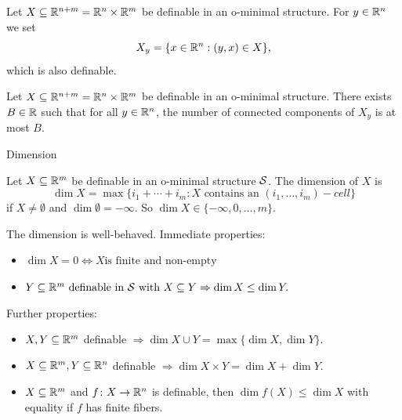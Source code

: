 \documentclass{beamer}
\begin{document}
\begin{frame}
  \begin{minipage}{0.6\linewidth}
    \begin{lemma}
      Let $X\subseteq {\mathbb{R}}^{n+m}= {\mathbb{R}}^{n}\times
      {\mathbb{R}}^m$ be definable in an o-minimal structure. For $y\in{\mathbb{R}}^n$ we set
      \begin{equation*}
        X_y = \{ x\in{\mathbb{R}}^n : (y,x)\in X\},
      \end{equation*}
      which is also definable. 
    \end{lemma}
  \end{minipage}  \begin{minipage}{0.3\linewidth}
  \end{minipage}

  \begin{theorem}
    Let $X\subseteq {\mathbb{R}}^{n+m}= {\mathbb{R}}^{n}\times
    {\mathbb{R}}^m$ be definable in an o-minimal structure.
    There exists $B\in{\mathbb{R}}$ such that for all
    $y\in{\mathbb{R}}^n$, the number of
    connected components of $X_y$ is at most $B$.
  \end{theorem}  
\end{frame}

\begin{frame}{Dimension}
  \begin{definition}
    Let $X\subseteq{\mathbb{R}}^m$ be definable in an o-minimal
    structure ${\mathcal S}$. The
    \alert{dimension} of $X$ is
    \begin{equation*}
      \dim X = \max \{i_1+\cdots+i_m: X\text{ contains an
      }(i_1,\ldots,i_m)-cell\}
    \end{equation*}
    if $X\not=\emptyset$ and $\dim \emptyset=-\infty$. So $\dim X \in
    \{-\infty, 0,\ldots,m\}$. 
  \end{definition}

  \vspace{-0.2cm}
  The dimension is well-behaved. Immediate properties:
  \begin{itemize}
    \vspace{-0.2cm}
  \item $\dim X = 0  \Leftrightarrow \text{$X$
      is finite and non-empty}$
  \item
        $\text{$Y\subseteq{\mathbb{R}}^m$ definable in ${\mathcal S}$ with  $X\subseteq Y$}
        \Rightarrow 
    \dim X\le \dim Y.$
  \end{itemize}
  \vspace{-0.2cm}
  Further properties:  
  \begin{itemize}
      \vspace{-0.2cm}
  \item $X,Y\subseteq{\mathbb{R}}^m$  definable $\Rightarrow \dim X\cup Y = \max\{\dim X,\dim Y\}$.
  \item $X\subseteq{\mathbb{R}}^m,Y\subseteq{\mathbb{R}}^n$  definable $\Rightarrow \dim
    X\times Y = \dim X +\dim Y$.
  \item $X\subseteq{\mathbb{R}}^m$ and $f\colon
    X\rightarrow{\mathbb{R}}^n$ is definable, then $\dim f(X) \le \dim X$ with
    equality if $f$ has finite fibers.
  \end{itemize}
\end{frame}
\end{document}
